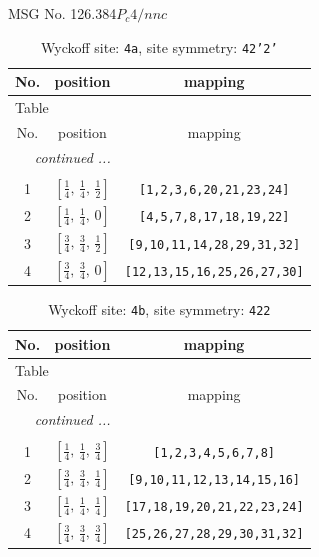 \documentclass[fleqn,8pt]{jsarticle}
\begin{document}
\setcounter{MaxMatrixCols}{32}

\renewcommand{\tablename}{Table~}
\renewcommand{\figurename}{Figure~}
\begin{center}
\LARGE
MSG No. 126.384\quad$P_{c}4/nnc$
\end{center}
\renewcommand{\arraystretch}{1.2}
\begin{longtable}{ccc}
\caption{Wyckoff site: {\tt 4a}, site symmetry: {\tt 42'2'}}
 \\
 \hline \hline
No. & position & mapping \\ \hline \endfirsthead

\multicolumn{2}{l}{\tablename\ \thetable{}} \\
 \hline \hline
No. & position & mapping \\ \hline \endhead

 \hline \hline
\multicolumn{2}{r}{\footnotesize\it continued ...} \\ \endfoot

 \hline \hline
\multicolumn{2}{r}{} \\ \endlastfoot

1 & $\left[ \frac{1}{4},\, \frac{1}{4},\, \frac{1}{2} \right]$ & {\tt [1,2,3,6,20,21,23,24]} \\ \hline
2 & $\left[ \frac{1}{4},\, \frac{1}{4},\, 0 \right]$ & {\tt [4,5,7,8,17,18,19,22]} \\ \hline
3 & $\left[ \frac{3}{4},\, \frac{3}{4},\, \frac{1}{2} \right]$ & {\tt [9,10,11,14,28,29,31,32]} \\ \hline
4 & $\left[ \frac{3}{4},\, \frac{3}{4},\, 0 \right]$ & {\tt [12,13,15,16,25,26,27,30]} \\
\end{longtable}
\renewcommand{\arraystretch}{1.2}
\begin{longtable}{ccc}
\caption{Wyckoff site: {\tt 4b}, site symmetry: {\tt 422}}
 \\
 \hline \hline
No. & position & mapping \\ \hline \endfirsthead

\multicolumn{2}{l}{\tablename\ \thetable{}} \\
 \hline \hline
No. & position & mapping \\ \hline \endhead

 \hline \hline
\multicolumn{2}{r}{\footnotesize\it continued ...} \\ \endfoot

 \hline \hline
\multicolumn{2}{r}{} \\ \endlastfoot

1 & $\left[ \frac{1}{4},\, \frac{1}{4},\, \frac{3}{4} \right]$ & {\tt [1,2,3,4,5,6,7,8]} \\ \hline
2 & $\left[ \frac{3}{4},\, \frac{3}{4},\, \frac{1}{4} \right]$ & {\tt [9,10,11,12,13,14,15,16]} \\ \hline
3 & $\left[ \frac{1}{4},\, \frac{1}{4},\, \frac{1}{4} \right]$ & {\tt [17,18,19,20,21,22,23,24]} \\ \hline
4 & $\left[ \frac{3}{4},\, \frac{3}{4},\, \frac{3}{4} \right]$ & {\tt [25,26,27,28,29,30,31,32]} \\
\end{longtable}
\end{document}
